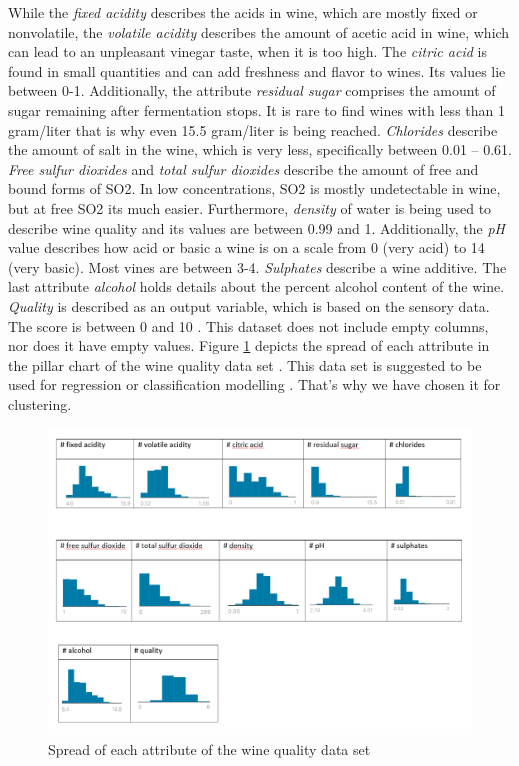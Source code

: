 While the \textit {fixed acidity} describes the acids in wine, which are mostly fixed or nonvolatile, the \textit {volatile acidity} describes the amount of acetic acid in wine, which can lead to an unpleasant vinegar taste, when it is too high.  The \textit {citric acid} is found in small quantities and can add freshness and flavor to wines. Its values lie between 0-1. \newline
Additionally, the attribute \textit{residual sugar} comprises the amount of sugar remaining after fermentation stops. It is rare to find wines with less than 1 gram/liter that is why even 15.5 gram/liter is being reached. \newline
\textit {Chlorides} describe the amount of salt in the wine, which is very less, specifically between 0.01 – 0.61. \newline
\textit {Free sulfur dioxides} and \textit {total sulfur dioxides} describe the amount of free and bound forms of SO2. In low concentrations, SO2 is mostly undetectable in wine, but at free SO2 its much easier.
Furthermore, \textit {density} of water is being used to describe wine quality and its values are between 
0.99 and 1. \newline
Additionally, the \textit {pH} value describes how acid or basic a wine is on a scale from 0 (very acid) to 14 (very basic). Most vines are between 3-4. \textit {Sulphates} describe a wine additive.
The last attribute \textit {alcohol} holds details about the percent alcohol content of the wine. 
\textit {Quality} is described as an output variable, which is based on the sensory data. The score is between 0 and 10 \cite{kaggle-redwine}.\newline
This dataset does not include empty columns, nor does it have empty values.
Figure \ref{fig:wine_stats} depicts the spread of each attribute in the pillar chart of the wine quality data set \cite{kaggle-redwine}. This data set is suggested to be used for regression or classification modelling \cite{kaggle-redwine}.
That’s why we have chosen it for clustering. \newline

\begin{figure}[H]
%
\centering
\includegraphics[width=1\textwidth]{images/wine_table1.PNG}
\caption{Spread of each attribute of the wine quality data set}
\label{fig:wine_stats}
\end{figure}
